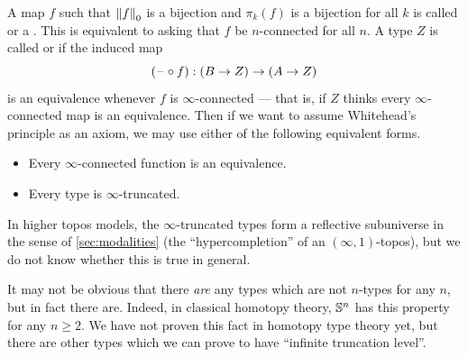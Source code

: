A map $f$ such that $\trunc0f$ is a bijection and $\pi_k(f)$ is a bijection for all $k$ is called %
%
or a .%
%
This is equivalent to asking that $f$ be $n$-connected for all $n$.
A type $Z$ is called %
%
or %
%
if the induced map
\[(\blank\circ f):(B\to Z) \to (A\to Z)\]
is an equivalence whenever $f$ is $\infty$-connected --- that is, if $Z$ thinks every $\infty$-connected map is an equivalence.
%
Then if we want to assume Whitehead's principle as an axiom, we may use either of the following equivalent forms.
\begin{itemize}
\item Every $\infty$-connected function is an equivalence.
\item Every type is $\infty$-truncated.
\end{itemize}
In higher topos models,
%
the $\infty$-truncated types form a reflective subuniverse in the sense of
\cref{sec:modalities} (the ``hypercompletion'' of an $(\infty,1)$-topos), but we do not know whether this is
true in general.

%
%

It may not be obvious that there \emph{are} any types which are not $n$-types for any $n$, but in fact there are.
Indeed, in classical homotopy theory, $\Sn^n$ has this property for any $n\ge 2$.
We have not proven this fact in homotopy type theory yet, but there are other types which we can prove to have ``infinite truncation level''.

